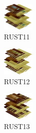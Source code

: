 \hspace{0.1cm}
\begin{minipage}[b]{0.15\linewidth}
\begin{figure}[H]                                                          
  \centering                                                             
  \begin{adjustbox}{width=1.5cm,center}                                   
  \includegraphics[width=1.5cm]{src/colorspace_colourflow/flows/colourflow_27-45.png}%
  \end{adjustbox}                                                        
\caption*{RUST11}                                           
\end{figure}                                                               
\end{minipage}
\hspace{0.1cm}
\begin{minipage}[b]{0.15\linewidth}
\begin{figure}[H]                                                          
  \centering                                                             
  \begin{adjustbox}{width=1.5cm,center}                                   
  \includegraphics[width=1.5cm]{src/colorspace_colourflow/flows/colourflow_28-45.png}%
  \end{adjustbox}                                                        
\caption*{RUST12}                                           
\end{figure}                                                               
\end{minipage}
\hspace{0.1cm}
\begin{minipage}[b]{0.15\linewidth}
\begin{figure}[H]                                                          
  \centering                                                             
  \begin{adjustbox}{width=1.5cm,center}                                   
  \includegraphics[width=1.5cm]{src/colorspace_colourflow/flows/colourflow_29-45.png}%
  \end{adjustbox}                                                        
\caption*{RUST13}                                           
\end{figure}                                                               
\end{minipage}
